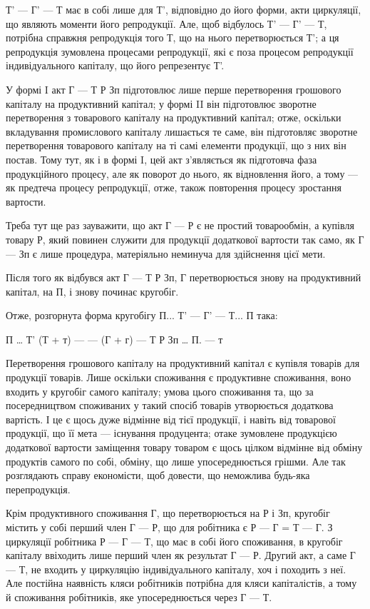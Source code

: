 Т' — Г' — Т має в собі лише для Т', відповідно до його форми,
акти циркуляції, що являють моменти його репродукції. Але, щоб відбулось
Т' — Г' — Т, потрібна справжня репродукція того Т, що на нього
перетворюється Т'; а ця репродукція зумовлена процесами репродукції,
які є поза процесом репродукції індивідуального капіталу, що його
репрезентує Т'.

У формі I акт Г — Т Р Зп підготовлює лише перше перетворення
грошового капіталу на продуктивний капітал; у формі II він підготовлює
зворотне перетворення з товарового капіталу на продуктивний капітал;
отже, оскільки вкладування промислового капіталу лишається те саме,
він підготовляє зворотне перетворення товарового капіталу на ті самі
елементи продукції, що з них він постав. Тому тут, як і в формі I, цей
акт з’являється як підготовча фаза продукційного процесу, але як
поворот до нього, як відновлення його, а тому — як предтеча процесу
репродукції, отже, також повторення процесу зростання вартости.

Треба тут ще раз зауважити, що акт Г — Р є не простий товарообмін,
а купівля товару Р, який повинен служити для продукції додаткової
вартости так само, як Г — Зп є лише процедура, матеріяльно неминуча
для здійснення цієї мети.

Після того як відбувся акт Г — Т Р Зп, Г перетворюється знову
на продуктивний капітал, на П, і знову починає кругобіг.

Отже, розгорнута форма кругобігу П... Т' — Г' — Т... П така:

П … Т' (Т + т) — — (Г + г) — Т Р Зп … П. — т

Перетворення грошового капіталу на продуктивний капітал є купівля
товарів для продукції товарів. Лише оскільки споживання є продуктивне
споживання, воно входить у кругобіг самого капіталу; умова цього споживання
та, що за посередництвом споживаних у такий спосіб товарів утворюється
додаткова вартість. І це є щось дуже відмінне від тієї продукції,
і навіть від товарової продукції, що її мета — існування продуцента;
отаке зумовлене продукцією додаткової вартости заміщення товару
товаром є щось цілком відмінне від обміну продуктів самого по собі,
обміну, що лише упосереднюється грішми. Але так розглядають справу
економісти, щоб довести, що неможлива будь-яка перепродукція.

Крім продуктивного споживання Г, що перетворюється на Р і Зп,
кругобіг містить у собі перший член Г — Р, що для робітника є Р — Г =
Т — Г. З циркуляції робітника Р — Г — Т, що має в собі його споживання,
в кругобіг капіталу ввіходить лише перший член як результат
Г — Р. Другий акт, а саме Г — Т, не входить у циркуляцію індивідуального
капіталу, хоч і походить з неї. Але постійна наявність кляси
робітників потрібна для кляси капіталістів, а тому й споживання робітників,
яке упосереднюється через Г — Т.

